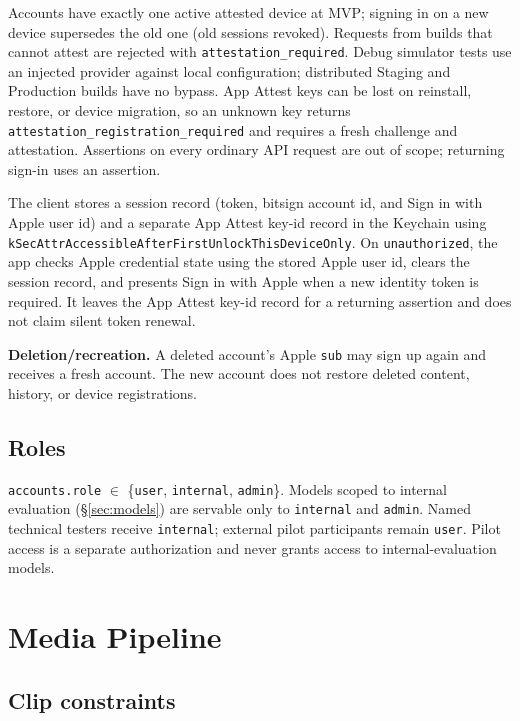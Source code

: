 \documentclass[11pt]{article}
\newcommand{\code}[1]{\texttt{#1}}
\begin{document}
Accounts have exactly one active attested device at MVP; signing in on a new device
supersedes the old one (old sessions revoked). Requests from builds that cannot
attest are rejected with \code{attestation\_required}. Debug simulator tests use an
injected provider against local configuration; distributed Staging and Production
builds have no bypass. App Attest keys can be lost on reinstall, restore, or device
migration, so an unknown key returns \code{attestation\_registration\_required} and
requires a fresh challenge and attestation. Assertions on every ordinary API request
are out of scope; returning sign-in uses an assertion.

The client stores a session record (token, bitsign account id, and Sign in with Apple
user id) and a separate App Attest key-id record in the Keychain using
\texttt{kSecAttrAccessibleAfterFirstUnlock}\allowbreak\texttt{ThisDeviceOnly}.
On \code{unauthorized}, the app checks Apple credential state using the stored Apple
user id, clears the session record, and presents Sign in with Apple when a new identity
token is required. It leaves the App Attest key-id record for a returning assertion and
does not claim silent token renewal.

\textbf{Deletion/recreation.} A deleted account's Apple \code{sub} may sign up
again and receives a fresh account. The new account does not restore deleted
content, history, or device registrations.

\subsection{Roles}

\code{accounts.role} $\in$ \{\code{user}, \code{internal}, \code{admin}\}.
Models scoped to internal evaluation (\S\ref{sec:models}) are servable only to
\code{internal} and \code{admin}. Named technical testers receive \code{internal};
external pilot participants remain \code{user}. Pilot access is a separate
authorization and never grants access to internal-evaluation models.

\section{Media Pipeline}

\subsection{Clip constraints}
\end{document}
